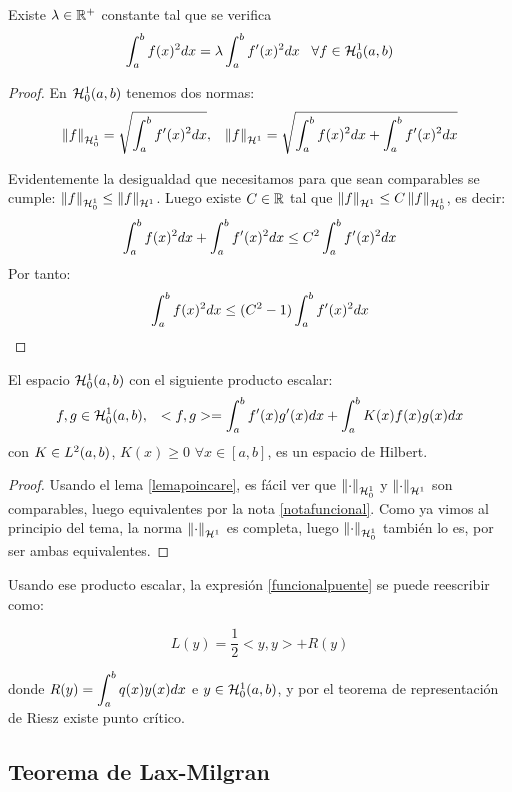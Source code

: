 \begin{prop}
\label{lemapoincare}
Existe $\lambda\in\R^+$ constante tal que se verifica
\[
\integral{a}{b}{f(x)^2dx}=\lambda\integral{a}{b}{f'(x)^2dx} \espacio \forall f\in\sobolevcero{1}
\]
\end{prop}

\begin{proof}

En $\sobolevcero{1}$ tenemos dos normas:
\[
\normasobolevcero{1}{f} = \sqrt{\integral{a}{b}{f'(x)^2dx}}, \espacio \normasobolev{1}{f}=\sqrt{\integral{a}{b}{f(x)^2dx}+\integral{a}{b}{f'(x)^2dx}}
\]

Evidentemente la desigualdad que necesitamos para que sean comparables se cumple: $\normasobolevcero{1}{f}\leq \normasobolev{1}{f}$. Luego existe $C\in\R$ tal que $\normasobolev{1}{f}\leq C\normasobolevcero{1}{f}$, es decir:
\[
\integral{a}{b}{f(x)^2dx}+\integral{a}{b}{f'(x)^2dx}\leq C^2\integral{a}{b}{f'(x)^2dx}
\]
Por tanto:
\[
\integral{a}{b}{f(x)^2dx}\leq (C^2-1)\integral{a}{b}{f'(x)^2dx}
\]

\end{proof}

\begin{prop}
El espacio $\sobolevcero[a,b]{1}$ con el siguiente producto escalar:
\[
f,g\in\sobolevcero[a,b]{1}, \espacio <f,g>=\integral{a}{b}{f'(x)g'(x)dx}+\integral{a}{b}{K(x)f(x)g(x)dx}
\]
con $K\in\lebesgue{2}$, $K(x)\geq 0$ $\forall x\in[a,b]$, es un espacio de Hilbert.
\end{prop}
\begin{proof}
Usando el lema \ref{lemapoincare}, es fácil ver que $\normasobolevcero{1}{\cdot}$ y $\normasobolev{1}{\cdot}$ son comparables, luego equivalentes por la nota \ref{notafuncional}. Como ya vimos al principio del tema, la norma $\normasobolev{1}{\cdot}$ es completa, luego $\normasobolevcero{1}{\cdot}$ también lo es, por ser ambas equivalentes.
\end{proof}

Usando ese producto escalar, la expresión \eqref{funcionalpuente} se puede reescribir como:

\[
L(y)=\frac{1}{2}<y,y>+R(y)
\]

donde $R(y)=\integral{a}{b}{q(x)y(x)dx}$ e $y\in\sobolevcero{1}$, y por el teorema de representación de Riesz existe punto crítico.

\subsection{Teorema de Lax-Milgran}

